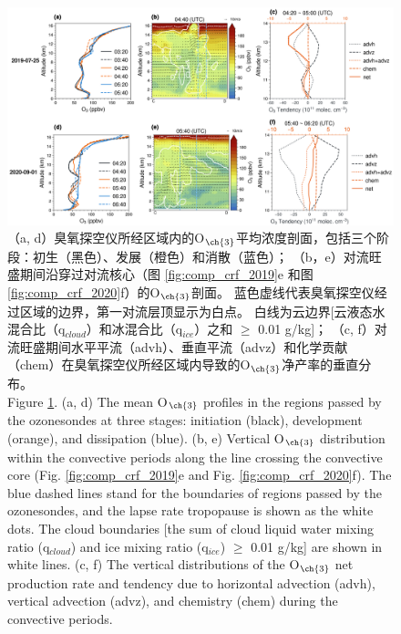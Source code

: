 \begin{landscape}
\clearpage\vspace*{\fill}
\begin{figure}[!htbp]
\centering
\includegraphics[width=0.75\columnwidth]{./figures/tendency_o3.png}
\caption{
（a, d）臭氧探空仪所经区域内的O$_{\ch{3}}$平均浓度剖面，包括三个阶段：初生（黑色）、发展（橙色）和消散（蓝色）；
（b，e）对流旺盛期间沿穿过对流核心（图 \ref{fig:comp_crf_2019}e 和图 \ref{fig:comp_crf_2020}f）的O$_{\ch{3}}$剖面。
蓝色虚线代表臭氧探空仪经过区域的边界，第一对流层顶显示为白点。
白线为云边界[云液态水混合比（q$_{cloud}$）和冰混合比（q$_{ice}$）之和 $\geq$ 0.01 g/kg]；
（c, f）对流旺盛期间水平平流（advh）、垂直平流（advz）和化学贡献（chem）在臭氧探空仪所经区域内导致的O$_{\ch{3}}$净产率的垂直分布。
\\
Figure \ref{fig:tendency_o3}. (a, d) The mean O$_{\ch{3}}$ profiles in the regions passed by the ozonesondes
at three stages: initiation (black), development (orange), and dissipation (blue).
(b, e) Vertical O$_{\ch{3}}$ distribution within the convective periods along the line crossing the convective core (Fig. \ref{fig:comp_crf_2019}e and Fig. \ref{fig:comp_crf_2020}f).
The blue dashed lines stand for the boundaries of regions passed by the ozonesondes, and the lapse rate tropopause is shown as the white dots.
The cloud boundaries [the sum of cloud liquid water mixing ratio (q$_{cloud}$) and ice mixing ratio (q$_{ice}$) $\geq$ 0.01 g/kg] are shown in white lines.
(c, f) The vertical distributions of the O$_{\ch{3}}$ net production rate and tendency due to horizontal advection (advh), vertical advection (advz), and chemistry (chem) during the convective periods.
}
\label{fig:tendency_o3}
\end{figure}
\vspace*{\fill}\clearpage
\end{landscape}


